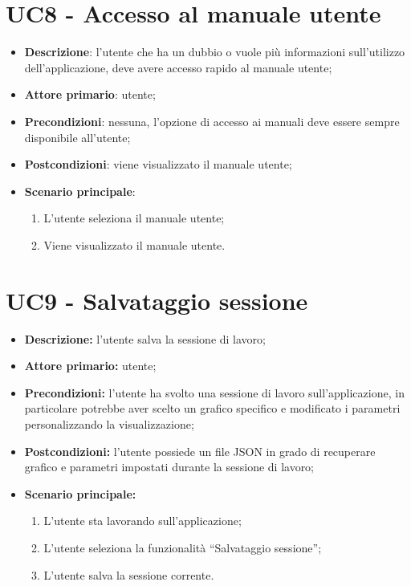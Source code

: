\section{UC8 - Accesso al manuale utente}
\begin{itemize}
  \item \textbf{Descrizione}: l'utente che ha un dubbio o vuole più informazioni sull'utilizzo dell'applicazione, deve avere accesso rapido al manuale utente;
  \item \textbf{Attore primario}: utente;
  \item \textbf{Precondizioni}: nessuna, l'opzione di accesso ai manuali deve essere sempre disponibile all'utente;
  \item \textbf{Postcondizioni}: viene visualizzato il manuale utente;
  \item \textbf{Scenario principale}:
  \begin{enumerate}
    \item L'utente seleziona il manuale utente;
    \item Viene visualizzato il manuale utente.
  \end{enumerate}
\end{itemize}

\section{UC9 - Salvataggio sessione}
\begin{itemize}
  \item \textbf{Descrizione:} l'utente salva la sessione di lavoro;
  \item \textbf{Attore primario:} utente;
  \item \textbf{Precondizioni:} l'utente ha svolto una sessione di lavoro sull'applicazione, in particolare potrebbe aver scelto un grafico specifico e modificato i parametri personalizzando la visualizzazione;
  \item \textbf{Postcondizioni:} l'utente possiede un file JSON in grado di recuperare grafico e parametri impostati durante la sessione di lavoro;
  \item \textbf{Scenario principale:}
  \begin{enumerate}
    \item L'utente sta lavorando sull'applicazione;
    \item L'utente seleziona la funzionalità ``Salvataggio sessione'';
    \item L'utente salva la sessione corrente.
  \end{enumerate}
\end{itemize}
